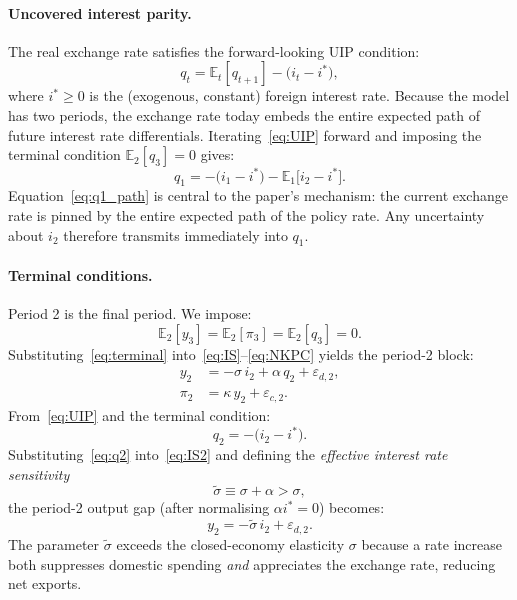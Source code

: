\paragraph{Uncovered interest parity.}
The real exchange rate satisfies the forward-looking UIP condition:
\begin{equation}
  q_t = \mathbb{E}_t[q_{t+1}] - \bigl(i_t - i^*\bigr),
  \label{eq:UIP}
\end{equation}
where $i^* \geq 0$ is the (exogenous, constant) foreign interest rate. Because the
model has two periods, the exchange rate today embeds the entire expected path of
future interest rate differentials. Iterating~\eqref{eq:UIP} forward and imposing the
terminal condition $\mathbb{E}_2[q_3] = 0$ gives:
\begin{equation}
  q_1 = -\bigl(i_1 - i^*\bigr) - \mathbb{E}_1\bigl[i_2 - i^*\bigr].
  \label{eq:q1_path}
\end{equation}
Equation~\eqref{eq:q1_path} is central to the paper's mechanism: the current exchange
rate is pinned by the entire expected path of the policy rate. Any uncertainty about
$i_2$ therefore transmits immediately into $q_1$.

\paragraph{Terminal conditions.}
Period 2 is the final period. We impose:
\begin{equation}
  \mathbb{E}_2[y_3] = \mathbb{E}_2[\pi_3] = \mathbb{E}_2[q_3] = 0.
  \label{eq:terminal}
\end{equation}
Substituting~\eqref{eq:terminal} into~\eqref{eq:IS}--\eqref{eq:NKPC} yields the
period-2 block:
\begin{align}
  y_2 &= -\sigma\, i_2 + \alpha\, q_2 + \varepsilon_{d,2}, \label{eq:IS2}\\
  \pi_2 &= \kappa\, y_2 + \varepsilon_{c,2}. \label{eq:NKPC2}
\end{align}
From~\eqref{eq:UIP} and the terminal condition:
\begin{equation}
  q_2 = -\bigl(i_2 - i^*\bigr).
  \label{eq:q2}
\end{equation}
Substituting~\eqref{eq:q2} into~\eqref{eq:IS2} and defining the \emph{effective
interest rate sensitivity}
\begin{equation}
  \tilde{\sigma} \equiv \sigma + \alpha > \sigma,
  \label{eq:sigma_tilde}
\end{equation}
the period-2 output gap (after normalising $\alpha i^* = 0$) becomes:
\begin{equation}
  y_2 = -\tilde{\sigma}\, i_2 + \varepsilon_{d,2}.
  \label{eq:IS2_reduced}
\end{equation}
The parameter $\tilde{\sigma}$ exceeds the closed-economy elasticity $\sigma$ because a
rate increase both suppresses domestic spending \emph{and} appreciates the exchange
rate, reducing net exports.

